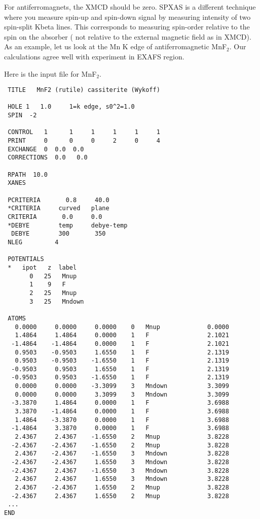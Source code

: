 \documentclass[11pt,oneside]{report} %
\begin{document}
For antiferromagnets, the XMCD should be zero.  SPXAS is a different technique
where you measure spin-up and spin-down signal by measuring intensity of two
spin-split Kbeta lines. This corresponds to measuring spin-order relative to
the spin on the absorber ( not relative to the external magnetic field as
in XMCD). As an example, let us look at the Mn K edge of antiferromagnetic
MnF$_2$.  Our calculations agree well with experiment in EXAFS region.

Here is the input file for MnF$_2$.

\begin{verbatim}
 TITLE   MnF2 (rutile) cassiterite (Wykoff)

 HOLE 1   1.0     1=k edge, s0^2=1.0
 SPIN  -2

 CONTROL   1      1     1     1     1     1
 PRINT     0      0     0     2     0     4
 EXCHANGE  0  0.0  0.0
 CORRECTIONS  0.0   0.0

 RPATH  10.0
 XANES

 PCRITERIA       0.8     40.0
 *CRITERIA     curved   plane
 CRITERIA       0.0     0.0
 *DEBYE        temp     debye-temp
  DEBYE        300       350
 NLEG         4

 POTENTIALS
 *   ipot   z  label
       0   25   Mnup
       1    9   F
       2   25   Mnup
       3   25   Mndown

 ATOMS
   0.0000     0.0000     0.0000    0   Mnup             0.0000
   1.4864     1.4864     0.0000    1   F                2.1021
  -1.4864    -1.4864     0.0000    1   F                2.1021
   0.9503    -0.9503     1.6550    1   F                2.1319
   0.9503    -0.9503    -1.6550    1   F                2.1319
  -0.9503     0.9503     1.6550    1   F                2.1319
  -0.9503     0.9503    -1.6550    1   F                2.1319
   0.0000     0.0000    -3.3099    3   Mndown           3.3099
   0.0000     0.0000     3.3099    3   Mndown           3.3099
  -3.3870     1.4864     0.0000    1   F                3.6988
   3.3870    -1.4864     0.0000    1   F                3.6988
   1.4864    -3.3870     0.0000    1   F                3.6988
  -1.4864     3.3870     0.0000    1   F                3.6988
   2.4367     2.4367    -1.6550    2   Mnup             3.8228
  -2.4367    -2.4367    -1.6550    2   Mnup             3.8228
   2.4367    -2.4367    -1.6550    3   Mndown           3.8228
  -2.4367    -2.4367     1.6550    3   Mndown           3.8228
  -2.4367     2.4367    -1.6550    3   Mndown           3.8228
   2.4367     2.4367     1.6550    3   Mndown           3.8228
   2.4367    -2.4367     1.6550    2   Mnup             3.8228
  -2.4367     2.4367     1.6550    2   Mnup             3.8228
 ...
END

\end{verbatim}
\end{document}
